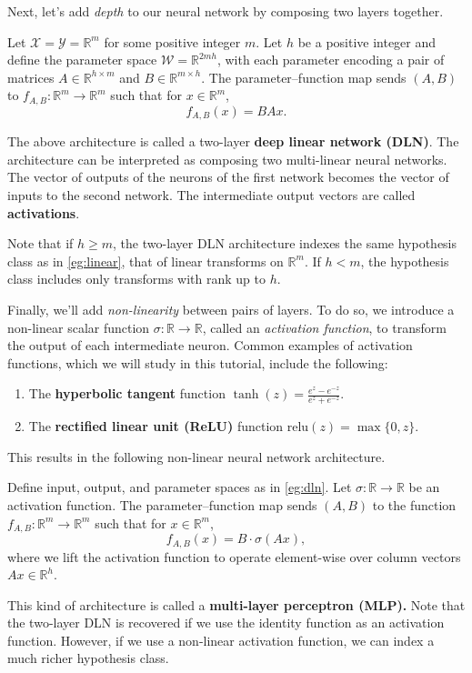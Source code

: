 \documentclass[11pt]{article}
\newcommand{\R}{\mathbb{R}}
\newcommand{\relu}{\mathrm{relu}}
\newcommand{\X}{\mathcal{X}}
\newcommand{\Y}{\mathcal{Y}}
\newcommand{\W}{\mathcal{W}}
\begin{document}
Next, let's add \emph{depth} to our neural network by composing two layers
together.

\begin{example}\label{eg:dln}
    Let $\X = \Y = \R^m$ for some positive integer $m$.
    Let $h$ be a positive integer and define the parameter space $\W =
    \R^{2mh}$, with each parameter encoding a pair of matrices
        $A \in \R^{h \times m}$
    and $B \in \R^{m \times h}$.
    The parameter--function map sends $(A, B)$ to $f_{A,B} : \R^m \to \R^m$
    such that for $x \in \R^m$,
    \begin{equation}
        f_{A,B}(x) = B A x.
    \end{equation}
\end{example}

The above architecture is called a two-layer \textbf{deep linear network
(DLN)}. The architecture can be interpreted as composing two multi-linear
neural networks. The vector of outputs of the neurons of the first network
becomes the vector of inputs to the second network. The intermediate output
vectors are called \textbf{activations}.

Note that if $h \geq m$, the two-layer DLN architecture indexes the same
hypothesis class as in \cref{eg:linear}, that of linear transforms on $\R^m$.
If $h < m$, the hypothesis class includes only transforms with rank up to $h$.

Finally, we'll add \emph{non-linearity} between pairs of layers. To do so, we
introduce a non-linear scalar function $\sigma : \R \to \R$, called an
\emph{activation function}, to transform the output of each intermediate
neuron. Common examples of activation functions, which we will study in this
tutorial, include the following:
\begin{enumerate}
    \item
        The \textbf{hyperbolic tangent} function
            $\displaystyle \tanh(z) = \frac{e^z-e^{-z}}{e^z + e^{-z}}$.
    \item
        The \textbf{rectified linear unit (ReLU)} function $\relu(z) = \max\{0, z\}$.
\end{enumerate}
This results in the following non-linear neural network architecture.

\begin{example}\label{eg:mlp}
    Define input, output, and parameter spaces as in \cref{eg:dln}.
    Let $\sigma : \R \to \R$ be an activation function.
    The parameter--function map sends $(A, B)$ to the function
        $f_{A,B} : \R^m \to \R^m$ such that for $x \in \R^m$,
    \begin{equation}
        f_{A,B}(x)
        = B \cdot \sigma( A x ),
    \end{equation}
    where we lift the activation function to operate element-wise over column
    vectors $A x \in \R^h$.
\end{example}
This kind of architecture is called a \textbf{multi-layer perceptron (MLP).}
Note that the two-layer DLN is recovered if we use the identity function as an
activation function. However, if we use a non-linear activation function, we
can index a much richer hypothesis class.
\end{document}
